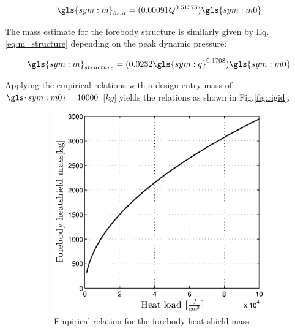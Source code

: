 \begin{equation}
\gls{sym:m}_{heat} = (0.00091Q^{0.51575})\gls{sym:m0}
\label{eq:tps_heat}
\end{equation}

The mass estimate for the forebody structure is similarly given by Eq.\ref{eq:m_structure}\cite[p.7]{Steinfeldt2009} depending on the peak dynamic pressure:

\begin{equation}
\gls{sym:m}_{structure} = (0.0232 \gls{sym:q} ^{0.1708} ) \gls{sym:m0}
\label{eq:m_structure}
\end{equation}

Applying the empirical relations with a design entry mass of $\gls{sym:m0} = 10000$ [$kg$] yields the relations as shown in Fig.\ref{fig:rigid}.

\begin{figure}[h]
	\centering
	\begin{subfigure}[b]{0.49\textwidth}
	\centering
	\includegraphics[width=1.0\textwidth]{Figure/rigidheat.eps}
	\caption{Empirical relation for the forebody heat shield mass} 
	\label{rigidheat}
	\end{subfigure}
	\begin{subfigure}[b]{0.49\textwidth}
	\centering

\end{subfigure}
\end{figure}
